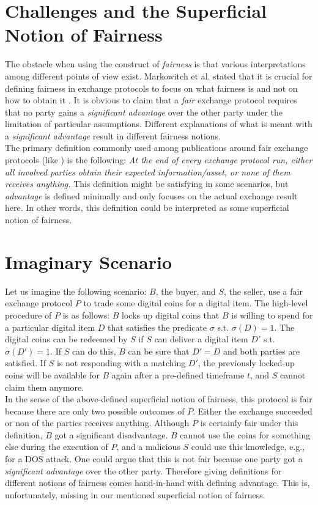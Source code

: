 \documentclass{cacthesis}
\begin{document}
        \section{Challenges and the Superficial Notion of Fairness}
		The obstacle when using the construct of \textit{fairness} is that various interpretations among different points of view exist. Markowitch et al. stated that it is crucial for defining fairness in exchange protocols to focus on what fairness is and not on how to obtain it \cite{10.1007/3-540-36552-4_31}. It is obvious to claim that a \textit{fair} exchange protocol requires that no party gains a \textit{significant advantage} over the other party under the limitation of particular assumptions. Different explanations of what is meant with a \textit{significant advantage} result in different fairness notions. \\
        The primary definition commonly used among publications around fair exchange protocols (like \cite{10.1145/266420.266426} \cite{asyncOptiFairEx1998} \cite{remarksOnFairEx2000})  is the following: \textit{At the end of every exchange protocol run, either all involved parties obtain their expected information/asset, or none of them receives anything.} This definition might be satisfying in some scenarios, but \textit{advantage} is defined minimally and only focuses on the actual exchange result here. In other words, this definition could be interpreted as some superficial notion of fairness.
        
        \section{Imaginary Scenario}
        Let us imagine the following scenario: $B$, the buyer, and $S$, the seller, use a fair exchange protocol $P$ to trade some digital coins for a digital item. The high-level procedure of $P$ is as follows: $B$ locks up digital coins that $B$ is willing to spend for a particular digital item $D$ that satisfies the predicate $\sigma$ s.t. $\sigma\left( D\right) =1$. The digital coins can be redeemed by $S$ if $S$ can deliver a digital item $D'$ s.t. $\sigma\left( D'\right) =1$. If $S$ can do this, $B$ can be sure that $D' = D$ and both parties are satisfied. If $S$ is not responding with a matching $D'$, the previously locked-up coins will be available for $B$ again after a pre-defined timeframe $t$, and $S$ cannot claim them anymore. \\
        In the sense of the above-defined superficial notion of fairness, this protocol is fair because there are only two possible outcomes of $P$. Either the exchange succeeded or non of the parties receives anything. 
        Although $P$ is certainly fair under this definition, $B$ got a significant disadvantage. $B$ cannot use the coins for something else during the execution of $P$, and a malicious $S$ could use this knowledge, e.g., for a DOS attack. One could argue that this is not fair because one party got a \textit{significant advantage} over the other party. Therefore giving definitions for different notions of fairness comes hand-in-hand with defining advantage. This is, unfortunately, missing in our mentioned superficial notion of fairness. 
        
\end{document}
